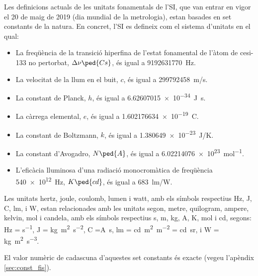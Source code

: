 Les definicions actuals de les unitats fonamentals de l'SI, que van entrar en vigor el 20 de maig de 2019 (dia mundial de la metrologia), estan basades en set constants de la natura. En concret, l'SI es defineix com el  sistema d'unitats en el qual:
\begin{itemize}

\item La freqüència de la transició hiperfina de l'estat fonamental de l'àtom de cesi-133 no pertorbat, $\Delta\nu\ped{Cs}$, és igual a \qty{9 192 631 770}{Hz}.
\item La velocitat de la llum en el buit, $c$, és igual a \qty{299792458}{m/s}.
\item La constant de Planck, $h$, és igual a \qty{6,62607015 e-34}{J.s}.
\item La càrrega elemental, $e$, és igual a \qty{1,602176634 e-19}{C}.
\item La constant de Boltzmann, $k$, és igual a \qty{1,380649e-23}{J/K}.
\item La constant d'Avogadro, $N\ped{A}$, és igual a \qty{6,02214076 e23}{mol^{-1}}.
\item L'eficàcia lluminosa d'una radiació monocromàtica de freqüència \qty{540e12}{Hz},  $K\ped{cd}$, és igual a \qty{683}{lm/W}.
\end{itemize}


Les unitats  hertz, joule, coulomb, lumen i watt, amb els símbols respectius Hz, J, C, lm, i W, estan relacionades amb les unitats segon, metre, quilogram, ampere, kelvin, mol i candela, amb els símbols respectius s, m, kg, A, K, mol i cd, segons:  Hz = \unit{s^{-1}}, J = \unit{kg.m^2.s^{-2}}, C =\unit{A.s}, lm = \unit{cd.m^2.m^{-2}} = \unit{cd.sr}, i W = \unit{kg.m^2.s^{-3}}.

El valor numèric de cadascuna d'aquestes set constants és exacte (vegeu l'apèndix \vref{sec:const_fis}).

